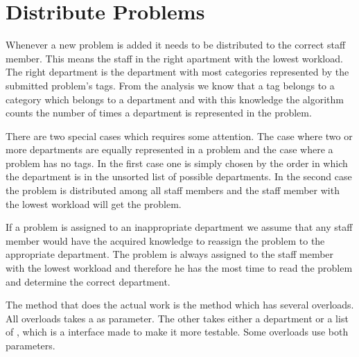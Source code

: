 \section{Distribute Problems}
\label{sec:dispro}
Whenever a new problem is added it needs to be distributed to the correct staff member.
This means the staff in the right apartment with the lowest workload. 
The right department is the department with most categories represented by the submitted problem's tags.
From the analysis we know that a tag belongs to a category which belongs to a department and with this knowledge the algorithm counts the number of times a department is represented in the problem.

There are two special cases which requires some attention. 
The case where two or more departments are equally represented in a problem and the case where a problem has no tags. 
In the first case one is simply chosen by the order in which the department is in the unsorted list of possible departments. 
In the second case the problem is distributed among all staff members and the staff member with the lowest workload will get the problem. 

If a problem is assigned to an inappropriate department we assume that any staff member would have the acquired knowledge to reassign the problem to the appropriate department. 
The problem is always assigned to the staff member with the lowest workload and therefore he has the most time to read the problem and determine the correct department.

The method that does the actual work is the  method which has several overloads. 
All overloads takes a  as parameter. 
The other takes either a department or a list of , which is a  interface made to make it more testable. 
Some overloads use both parameters.